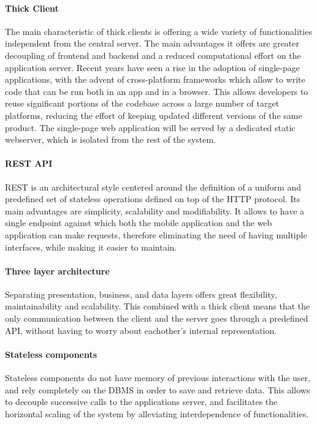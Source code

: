 \paragraph{Thick Client}
The main characteristic of thick clients is offering a wide variety of functionalities independent from the central server.
The main advantages it offers are greater decoupling of frontend and backend and a reduced computational effort on the application server.
Recent years have seen a rise in the adoption of single-page applications, with the advent of cross-platform frameworks which allow to write code that can be run both in an app and in a browser.
This allows developers to reuse significant portions of the codebase across a large number of target platforms, reducing the effort of keeping updated different versions of the same product.
The single-page web application will be served by a dedicated static webserver, which is isolated from the rest of the system.

\paragraph{REST API}
REST is an architectural style centered around the definition of a uniform and predefined set of stateless operations defined on top of the HTTP protocol.
Its main advantages are simplicity, scalability and modifiability.
It allows to have a single endpoint against which both the mobile application and the web application can make requests, therefore eliminating the need of having multiple interfaces, while making it easier to maintain.

\paragraph{Three layer architecture}
Separating presentation, business, and data layers offers great flexibility, maintainability and scalability.
This combined with a thick client means that the only communication between the client and the server goes through a predefined API, without having to worry about eachother's internal representation.

\paragraph{Stateless components}
Stateless components do not have memory of previous interactions with the user, and rely completely on the DBMS in order to save and retrieve data. This allows to decouple successive calls to the applications server, and facilitates the horizontal scaling of the system by alleviating interdependence of functionalities.

